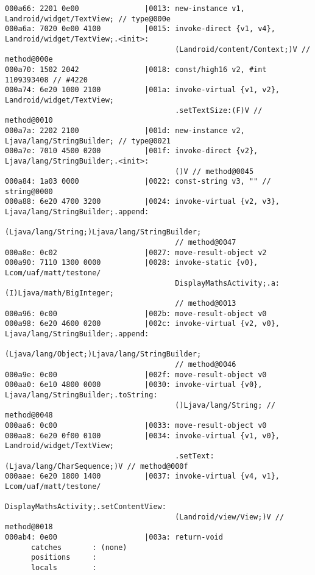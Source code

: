 \begin{lstlisting}
000a66: 2201 0e00               |0013: new-instance v1, Landroid/widget/TextView; // type@000e
000a6a: 7020 0e00 4100          |0015: invoke-direct {v1, v4}, Landroid/widget/TextView;.<init>:
                                       (Landroid/content/Context;)V // method@000e
000a70: 1502 2042               |0018: const/high16 v2, #int 1109393408 // #4220
000a74: 6e20 1000 2100          |001a: invoke-virtual {v1, v2}, Landroid/widget/TextView;
                                       .setTextSize:(F)V // method@0010
000a7a: 2202 2100               |001d: new-instance v2, Ljava/lang/StringBuilder; // type@0021
000a7e: 7010 4500 0200          |001f: invoke-direct {v2}, Ljava/lang/StringBuilder;.<init>:
                                       ()V // method@0045
000a84: 1a03 0000               |0022: const-string v3, "" // string@0000
000a88: 6e20 4700 3200          |0024: invoke-virtual {v2, v3}, Ljava/lang/StringBuilder;.append:
                                       (Ljava/lang/String;)Ljava/lang/StringBuilder;
                                       // method@0047
000a8e: 0c02                    |0027: move-result-object v2
000a90: 7110 1300 0000          |0028: invoke-static {v0}, Lcom/uaf/matt/testone/
                                       DisplayMathsActivity;.a:(I)Ljava/math/BigInteger;
                                       // method@0013
000a96: 0c00                    |002b: move-result-object v0
000a98: 6e20 4600 0200          |002c: invoke-virtual {v2, v0}, Ljava/lang/StringBuilder;.append:
                                       (Ljava/lang/Object;)Ljava/lang/StringBuilder;
                                       // method@0046
000a9e: 0c00                    |002f: move-result-object v0
000aa0: 6e10 4800 0000          |0030: invoke-virtual {v0}, Ljava/lang/StringBuilder;.toString:
                                       ()Ljava/lang/String; // method@0048
000aa6: 0c00                    |0033: move-result-object v0
000aa8: 6e20 0f00 0100          |0034: invoke-virtual {v1, v0}, Landroid/widget/TextView;
                                       .setText:(Ljava/lang/CharSequence;)V // method@000f
000aae: 6e20 1800 1400          |0037: invoke-virtual {v4, v1}, Lcom/uaf/matt/testone/
                                       DisplayMathsActivity;.setContentView:
                                       (Landroid/view/View;)V // method@0018
000ab4: 0e00                    |003a: return-void
      catches       : (none)
      positions     :
      locals        :


\end{lstlisting}
